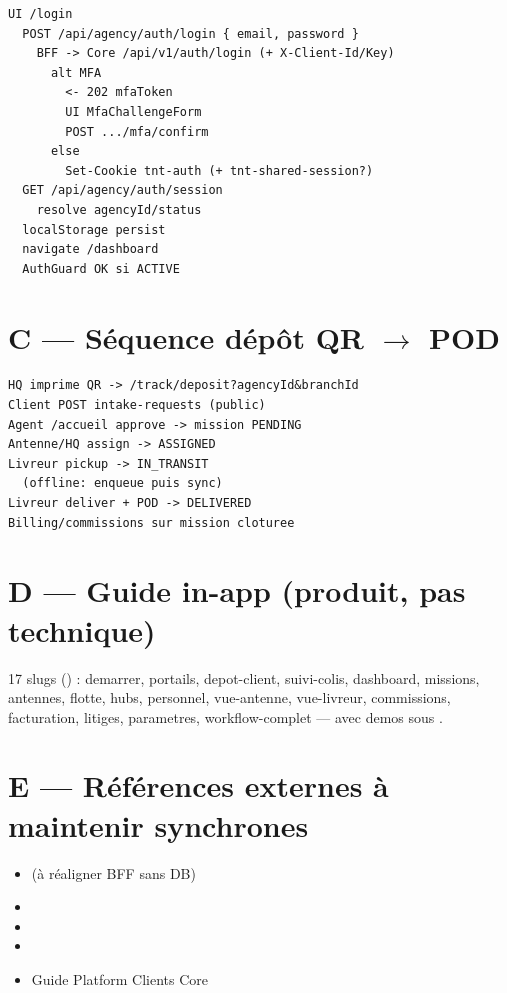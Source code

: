 \begin{lstlisting}
UI /login
  POST /api/agency/auth/login { email, password }
    BFF -> Core /api/v1/auth/login (+ X-Client-Id/Key)
      alt MFA
        <- 202 mfaToken
        UI MfaChallengeForm
        POST .../mfa/confirm
      else
        Set-Cookie tnt-auth (+ tnt-shared-session?)
  GET /api/agency/auth/session
    resolve agencyId/status
  localStorage persist
  navigate /dashboard
  AuthGuard OK si ACTIVE
\end{lstlisting}

\section{C --- Séquence dépôt QR $\rightarrow$ POD}

\begin{lstlisting}
HQ imprime QR -> /track/deposit?agencyId&branchId
Client POST intake-requests (public)
Agent /accueil approve -> mission PENDING
Antenne/HQ assign -> ASSIGNED
Livreur pickup -> IN_TRANSIT
  (offline: enqueue puis sync)
Livreur deliver + POD -> DELIVERED
Billing/commissions sur mission cloturee
\end{lstlisting}

\section{D --- Guide in-app (produit, pas technique)}

17 slugs () : demarrer, portails, depot-client,
suivi-colis, dashboard, missions, antennes, flotte, hubs, personnel,
vue-antenne, vue-livreur, commissions, facturation, litiges, parametres,
workflow-complet --- avec demos sous .

\section{E --- Références externes à maintenir synchrones}

\begin{itemize}
  \item {} (à réaligner BFF sans DB)
  \item {}
  \item {}
  \item {}
  \item Guide Platform Clients Core
\end{itemize}

